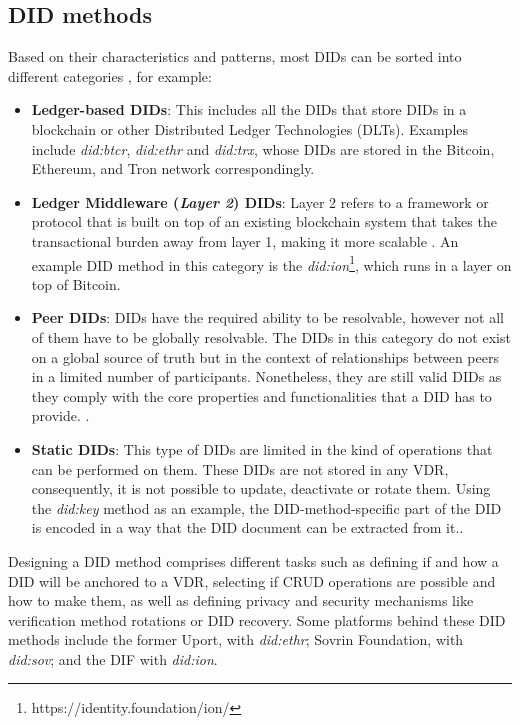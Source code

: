 \subsection{DID methods}\label{subsec:did_methods}

 Based on their characteristics and patterns, most DIDs can be sorted into different categories \cite{preukschat_reed_2021}, for example: 

\begin{itemize}
  \item \textbf{Ledger-based DIDs}: This includes all the DIDs that store DIDs in a blockchain or other Distributed Ledger Technologies (DLTs). Examples include \emph{did:btcr}, \emph{did:ethr} and \emph{did:trx}, whose DIDs are stored in the Bitcoin, Ethereum, and Tron network correspondingly.
  \item \textbf{Ledger Middleware (\emph{Layer 2}) DIDs}: Layer 2 refers to a framework or protocol that is built on top of an existing blockchain system that takes the transactional burden away from layer 1, making it more scalable \cite{weston_2022}. An example DID method in this category is the \emph{did:ion}\footnote{https://identity.foundation/ion/}, which runs in a layer on top of Bitcoin. 
  \item \textbf{Peer DIDs}: DIDs have the required ability to be resolvable, however not all of them have to be globally resolvable. The DIDs in this category do not exist on a global source of truth but in the context of relationships between peers in a limited number of participants. Nonetheless, they are still valid DIDs as they comply with the core properties and functionalities that a DID has to provide. \cite{preukschat_reed_2021}.
  \item \textbf{Static DIDs}: This type of DIDs are limited in the kind of operations that can be performed on them. These DIDs are not stored in any VDR, consequently, it is not possible to update, deactivate or rotate them. Using the \emph{did:key} method as an example, the DID-method-specific part of the DID is encoded in a way that the DID document can be extracted from it.\cite{longley_zagidulin_sporny_2022}.
\end{itemize}

Designing a DID method comprises different tasks such as defining if and how a DID will be anchored to a VDR, selecting if CRUD operations are possible and how to make them, as well as defining privacy and security mechanisms like verification method rotations or DID recovery. Some platforms behind these DID methods include the former Uport, with \emph{did:ethr}; Sovrin Foundation, with \emph{did:sov}; and the DIF with \emph{did:ion}.

